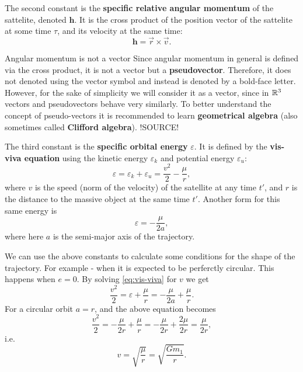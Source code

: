 The second constant is the \textbf{specific relative angular momentum} of the sattelite, denoted $\bm{h}$. It is the cross product of the position vector of the sattelite at some time $\tau$, and its velocity at the same time:
\begin{equation}
	\bm{h} = \vec{r}\times\vec{v}.
	\label{eq:specific_relative_angular_momentum}
\end{equation}
\begin{note}{Angular momentum is not a vector}{}
	Since angular momentum in general is defined via the cross product, it is not a vector but a \textbf{pseudovector}. Therefore, it does not denoted using the vector symbol and instead is denoted by a bold-face letter. However, for the sake of simplicity we will consider it as a vector, since in $\Rs[3]$ vectors and pseudovectors behave very similarly. To better understand the concept of pseudo-vectors it is recommended to learn \textbf{geometrical algebra} (also sometimes called \textbf{Clifford algebra}). !SOURCE!
\end{note}

The third constant is the \textbf{specific orbital energy} $\varepsilon$. It is defined by the \textbf{vis-viva equation} using the kinetic energy $\varepsilon_{k}$ and potential energy $\varepsilon_{u}$:
\begin{equation}
	\varepsilon = \varepsilon_{k}+\varepsilon_{u} = \frac{v^{2}}{2} - \frac{\mu}{r},
	\label{eq:vis-viva}
\end{equation}
where $v$ is the speed (norm of the velocity) of the satellite at any time $t'$, and $r$ is the distance to the massive object at the same time $t'$. Another form for this same energy is
\begin{equation}
	\varepsilon = -\frac{\mu}{2a},
	\label{eq:vis-viva2}
\end{equation}
where here $a$ is the semi-major axis of the trajectory.

We can use the above constants to calculate some conditions for the shape of the trajectory. For example - when it is expected to be perferctly circular. This happens when $e=0$. By solving \autoref{eq:vis-viva} for $v$ we get
\[
	\frac{v^{2}}{2} = \varepsilon+\frac{\mu}{r} = -\frac{\mu}{2a} + \frac{\mu}{r}.
\]
For a circular orbit $a=r$, and the above equation becomes
\[
	\frac{v^{2}}{2} = -\frac{\mu}{2r} + \frac{\mu}{r} = -\frac{\mu}{2r} + \frac{2\mu}{2r} = \frac{\mu}{2r},
\]
i.e.
\begin{equation}
	v = \sqrt{\frac{\mu}{r}} = \sqrt{\frac{Gm_{1}}{r}}.
	\label{eq:speed_circular_orbit}
\end{equation}

